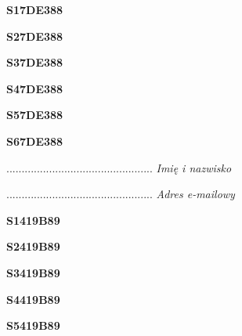 \begin{turn}{90}\huge \textbf{S17DE388}\end{turn}

\begin{turn}{90}\huge \textbf{S27DE388}\end{turn}

\begin{turn}{90}\huge \textbf{S37DE388}\end{turn}

\begin{turn}{90}\huge \textbf{S47DE388}\end{turn}

\begin{turn}{90}\huge \textbf{S57DE388}\end{turn}

\begin{turn}{90}\huge \textbf{S67DE388}\end{turn}

\begin{turn}{90}\begin{minipage}{\linewidth} \vspace{20mm} ................................................  \textit{Imię i nazwisko}\end{minipage}\end{turn}

\begin{turn}{90}\begin{minipage}{\linewidth} \vspace{20mm} ................................................  \textit{Adres e-mailowy}\end{minipage}\end{turn}

\begin{turn}{90}\huge \textbf{S1419B89}\end{turn}

\begin{turn}{90}\huge \textbf{S2419B89}\end{turn}

\begin{turn}{90}\huge \textbf{S3419B89}\end{turn}

\begin{turn}{90}\huge \textbf{S4419B89}\end{turn}

\begin{turn}{90}\huge \textbf{S5419B89}\end{turn}

